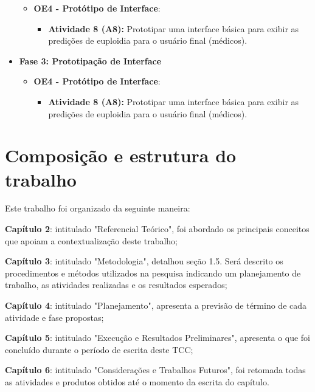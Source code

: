 \begin{itemize}
\begin{itemize}
        \item \textbf{OE4 - Protótipo de Interface}: 
        \begin{itemize}
            \item \textbf{Atividade 8 (A8):} Prototipar uma interface básica para exibir as predições de euploidia para o usuário final (médicos).
        \end{itemize}
    \end{itemize}

    \item \textbf{Fase 3: Prototipação de Interface}
    \begin{itemize}
        \item \textbf{OE4 - Protótipo de Interface}: 
        \begin{itemize}
            \item \textbf{Atividade 8 (A8):} Prototipar uma interface básica para exibir as predições de euploidia para o usuário final (médicos).
        \end{itemize}
    \end{itemize}
\end{itemize}

\section{Composição e estrutura do trabalho}
Este trabalho foi organizado da seguinte maneira:

\textbf{Capítulo 2}: intitulado "Referencial Teórico", foi abordado os principais conceitos que apoiam a contextualização deste trabalho;

\textbf{Capítulo 3}: intitulado "Metodologia", detalhou seção 1.5. Será descrito os procedimentos e métodos utilizados na pesquisa indicando um planejamento de trabalho, as atividades realizadas e os resultados esperados;

\textbf{Capítulo 4}: intitulado "Planejamento", apresenta a previsão de término de cada atividade e fase propostas;

\textbf{Capítulo 5}: intitulado "Execução e Resultados Preliminares", apresenta o que foi concluído durante o período de escrita deste TCC;

\textbf{Capítulo 6}: intitulado "Considerações e Trabalhos Futuros", foi retomada todas as atividades e produtos obtidos até o momento da escrita do capítulo.